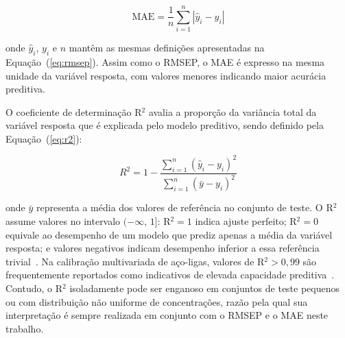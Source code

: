 \begin{equation}
   \textrm{MAE} = \dfrac{1}{n}\sum_{i=1}^{n}|\widehat{y}_i - y_i|
\label{eq:mae}
\end{equation}

\noindent onde $\widehat{y}_i$, $y_i$ e $n$ mantêm as mesmas 
definições apresentadas na Equação~(\ref{eq:rmsep}). Assim como 
o \gls{RMSEP}, o \gls{MAE} é expresso na mesma unidade da variável 
resposta, com valores menores indicando maior acurácia preditiva.

O coeficiente de determinação R$^2$ avalia a proporção da variância total da variável resposta que é explicada pelo modelo preditivo, sendo definido pela Equação~(\ref{eq:r2}):

\begin{equation}
   R^2 = 1 - \dfrac{\displaystyle\sum_{i=1}^{n}(\widehat{y}_i - y_i)^2}
                   {\displaystyle\sum_{i=1}^{n}(\bar{y} - y_i)^2}
\label{eq:r2}
\end{equation}

\noindent onde $\bar{y}$ representa a média dos valores de referência 
no conjunto de teste. O R$^2$ assume valores no intervalo 
$(-\infty,\, 1]$: R$^2 = 1$ indica ajuste perfeito; R$^2 = 0$ 
equivale ao desempenho de um modelo que prediz apenas a média da 
variável resposta; e valores negativos indicam desempenho inferior 
a essa referência trivial~\cite{ezenarro2025chemometric}. Na 
calibração multivariada de aço-ligas, valores de R$^2 > 0{,}99$ 
são frequentemente reportados como indicativos de elevada capacidade 
preditiva~\cite{Westad2024,kumari2024,perisdiaz2021}. Contudo, o R$^2$ 
isoladamente pode ser enganoso em conjuntos de teste pequenos ou 
com distribuição não uniforme de concentrações, razão pela qual 
sua interpretação é sempre realizada em conjunto com o \gls{RMSEP} 
e o \gls{MAE} neste trabalho.